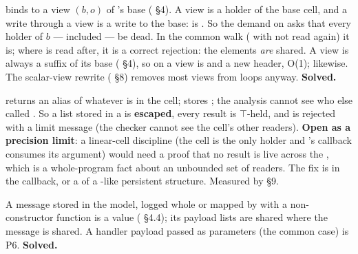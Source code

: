 
\code{[ x, …rest ]} binds  to a view $(b,\allowbreak{}o)$ of 's base ( §4). A view is a holder of the base cell, and a write through a view is a write to the base:  is . So the demand on  asks that every holder of $b$ —  included — be dead. In the common walk ( with  not read again) it is; where  is read after, it is a correct rejection: the elements \emph{are} shared. A view is always a suffix of its base ( §4), so  on a view is  and a new header, O(1);  likewise. The scalar-view rewrite ( §8) removes most views from loops anyway. \textbf{Solved.}


 returns an alias of whatever is in the cell;  stores ; the analysis cannot see who else called . So a list stored in a  is \textbf{escaped}, every  result is $\top$-held, and  is rejected with a limit message (the checker cannot see the cell's other readers). \textbf{Open as a precision limit}: a linear-cell discipline (the cell is the only holder and 's callback consumes its argument) would need a proof that no  result is live across the , which is a whole-program fact about an unbounded set of readers. The fix is  in the callback, or a  of a -like persistent structure. Measured by §9.


A message stored in the model, logged whole or mapped by  with a non-constructor function is a value ( §4.4); its payload lists are shared where the message is shared. A handler payload passed as parameters (the common case) is P6. \textbf{Solved.}

